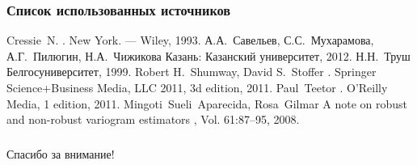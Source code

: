 \documentclass[notheorems]{beamer}
\theoremstyle{definition}
\theoremstyle{example}
\theoremstyle{plain}
\begin{document}
\begin{frame}
  \frametitle{Список использованных источников}
  \begin{scriptsize}
  \begin{thebibliography}{5}
    \beamertemplatebookbibitems
      Cressie~N.
      .
      \newblock New York. --- Wiley, 1993.
    \beamertemplatebookbibitems
      А.А.~Савельев, С.С.~Мухарамова, А.Г.~Пилюгин, Н.А.~Чижикова
      \newblock Казань: Казанский университет, 2012.
    \beamertemplatebookbibitems
      Н.Н.~Труш
      \newblock Белгосуниверситет, 1999.
    \beamertemplatebookbibitems
      Robert H.~Shumway, David S.~Stoffer
      .
      \newblock Springer Science+Business Media, LLC 2011, 3d edition, 2011.
    \beamertemplatebookbibitems
      Paul~Teetor
      .
      \newblock O’Reilly Media, 1 edition, 2011.
    \beamertemplatearticlebibitems
      Mingoti~Sueli~Aparecida, Rosa~Gilmar
      \newblock A note on robust and non-robust variogram estimators
      , Vol. 61:87–95, 2008.
  \end{thebibliography}
\end{scriptsize}
\end{frame}

\begin{frame}
  \frametitle{\null}
  \begin{center}
    {\Huge Спасибо за внимание!}
  \end{center}
\end{frame}
\end{document}
